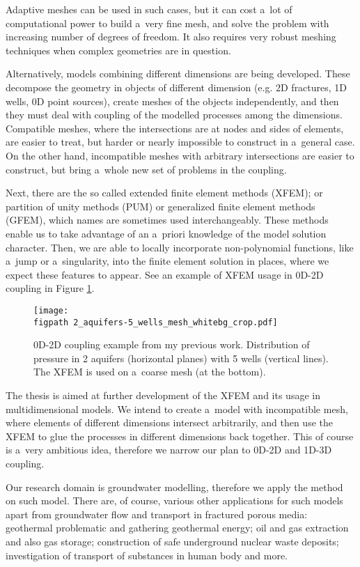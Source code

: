 \documentclass[bibliography=totocnumbered,dvipsnames,FM,Dis]{tulthesis}
\newcommand{\fig}[1]{Figure \hyperref[#1]{\ref{#1}}}
\newcommand{\figpath}{figures/}
\begin{document}
Adaptive meshes can be used in such cases, but it can cost a~lot of computational power to build a~very fine mesh,
and solve the problem with increasing number of degrees of freedom.
It also requires very robust meshing techniques when complex geometries are in question.

Alternatively, models combining different dimensions are being developed. These decompose the geometry
in objects of different dimension (e.g. 2D fractures, 1D wells, 0D point sources), create meshes of the objects independently,
and then they must deal with coupling of the modelled processes among the dimensions. 
Compatible meshes, where the intersections are at nodes and sides of elements, are easier to treat, but harder
or nearly impossible to construct in a~general case. On the other hand, incompatible meshes with arbitrary intersections are easier to construct, 
but bring a~whole new set of problems in the coupling.

Next, there are the so called extended finite element methods (XFEM); or partition of unity methods (PUM) or generalized
finite element methods (GFEM), which names are sometimes used interchangeably. 
These methods enable us to take advantage of an a~priori knowledge of the model solution character.
Then, we are able to locally incorporate non-polynomial functions, like a~jump or a~singularity, into the finite element solution
 in places, where we expect these features to appear. See an example of XFEM usage in 0D-2D coupling in \fig{fig:aquifers}.
\begin{figure}[!htb]
  \centering    
    \texttt{[image: \\figpath 2\_aquifers-5\_wells\_mesh\_whitebg\_crop.pdf]}
  \caption{0D-2D coupling example from my previous work. Distribution of pressure in 2 aquifers (horizontal planes) with 5 wells 
          (vertical lines). The XFEM is used on a~coarse mesh (at the bottom). }
  \label{fig:aquifers}
\end{figure}

The thesis is aimed at further development of the XFEM and its usage in multidimensional models. 
We intend to create a~model with incompatible mesh, where elements of different dimensions intersect
arbitrarily, and then use the XFEM to glue the processes in different dimensions back together. 
This of course is a~very ambitious idea, therefore we narrow our plan to 0D-2D and 1D-3D coupling. 

Our research domain is groundwater modelling, therefore we apply the method on such model.
There are, of course, various other applications for such models apart from groundwater flow and transport in fractured porous media:
geothermal problematic and gathering geothermal energy; oil and gas extraction and also gas storage;
construction of safe underground nuclear waste deposits; investigation of transport of substances in human body
and more.
\end{document}
